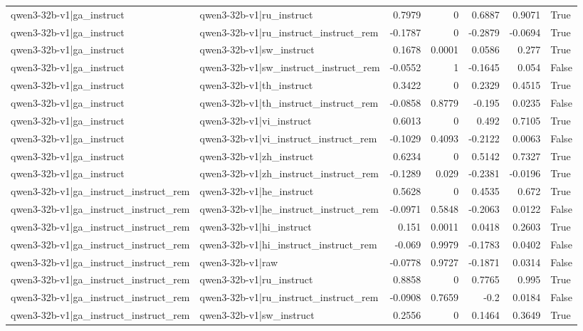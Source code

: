 \begin{table}
\begin{tabular}{l l r r r r l}
qwen3-32b-v1|ga_instruct & qwen3-32b-v1|ru_instruct & 0.7979 & 0 & 0.6887 & 0.9071 & True \\
qwen3-32b-v1|ga_instruct & qwen3-32b-v1|ru_instruct_instruct_rem & -0.1787 & 0 & -0.2879 & -0.0694 & True \\
qwen3-32b-v1|ga_instruct & qwen3-32b-v1|sw_instruct & 0.1678 & 0.0001 & 0.0586 & 0.277 & True \\
qwen3-32b-v1|ga_instruct & qwen3-32b-v1|sw_instruct_instruct_rem & -0.0552 & 1 & -0.1645 & 0.054 & False \\
qwen3-32b-v1|ga_instruct & qwen3-32b-v1|th_instruct & 0.3422 & 0 & 0.2329 & 0.4515 & True \\
qwen3-32b-v1|ga_instruct & qwen3-32b-v1|th_instruct_instruct_rem & -0.0858 & 0.8779 & -0.195 & 0.0235 & False \\
qwen3-32b-v1|ga_instruct & qwen3-32b-v1|vi_instruct & 0.6013 & 0 & 0.492 & 0.7105 & True \\
qwen3-32b-v1|ga_instruct & qwen3-32b-v1|vi_instruct_instruct_rem & -0.1029 & 0.4093 & -0.2122 & 0.0063 & False \\
qwen3-32b-v1|ga_instruct & qwen3-32b-v1|zh_instruct & 0.6234 & 0 & 0.5142 & 0.7327 & True \\
qwen3-32b-v1|ga_instruct & qwen3-32b-v1|zh_instruct_instruct_rem & -0.1289 & 0.029 & -0.2381 & -0.0196 & True \\
qwen3-32b-v1|ga_instruct_instruct_rem & qwen3-32b-v1|he_instruct & 0.5628 & 0 & 0.4535 & 0.672 & True \\
qwen3-32b-v1|ga_instruct_instruct_rem & qwen3-32b-v1|he_instruct_instruct_rem & -0.0971 & 0.5848 & -0.2063 & 0.0122 & False \\
qwen3-32b-v1|ga_instruct_instruct_rem & qwen3-32b-v1|hi_instruct & 0.151 & 0.0011 & 0.0418 & 0.2603 & True \\
qwen3-32b-v1|ga_instruct_instruct_rem & qwen3-32b-v1|hi_instruct_instruct_rem & -0.069 & 0.9979 & -0.1783 & 0.0402 & False \\
qwen3-32b-v1|ga_instruct_instruct_rem & qwen3-32b-v1|raw & -0.0778 & 0.9727 & -0.1871 & 0.0314 & False \\
qwen3-32b-v1|ga_instruct_instruct_rem & qwen3-32b-v1|ru_instruct & 0.8858 & 0 & 0.7765 & 0.995 & True \\
qwen3-32b-v1|ga_instruct_instruct_rem & qwen3-32b-v1|ru_instruct_instruct_rem & -0.0908 & 0.7659 & -0.2 & 0.0184 & False \\
qwen3-32b-v1|ga_instruct_instruct_rem & qwen3-32b-v1|sw_instruct & 0.2556 & 0 & 0.1464 & 0.3649 & True \\

\end{tabular}
\end{table}
